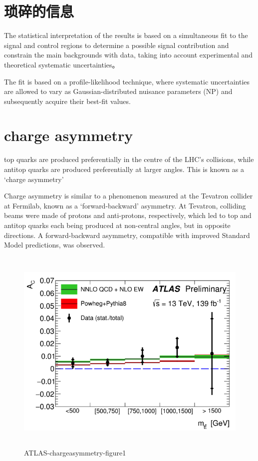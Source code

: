 \documentclass{ctexart}
\begin{document}
\section{琐碎的信息}
The statistical interpretation of the results is based on a simultaneous fit to the
signal and control regions to determine a possible signal contribution and constrain the main backgrounds
with data, taking into account experimental and theoretical systematic uncertainties。\par

The fit is based on a profile-likelihood technique, where systematic uncertainties are allowed
to vary as Gaussian-distributed nuisance parameters (NP) and subsequently acquire their best-fit values.\par


\section{charge asymmetry}
top quarks are produced preferentially in the centre of the LHC’s collisions, while antitop quarks are produced preferentially at larger angles. This is known as a ‘charge asymmetry’\par
Charge asymmetry is similar to a phenomenon measured at the Tevatron collider at Fermilab, known as a ‘forward-backward’ asymmetry. At Tevatron, colliding beams were made of protons and anti-protons, respectively, which led to top and antitop quarks each being produced at non-central angles, but in opposite directions. A forward-backward asymmetry, compatible with improved Standard Model predictions, was observed.

\begin{figure}
    \centering
    \includegraphics[width=\textwidth,height=10cm]{ATLAS-chargeasymmetry-figure1.png}
    \caption{ATLAS-chargeasymmetry-figure1}
    \label{fig:my_label}
\end{figure}
\end{document}
